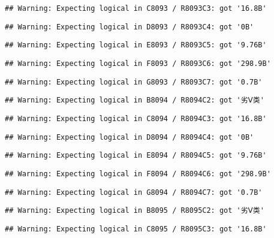 \documentclass[
]{article}
\begin{document}
\begin{verbatim}
## Warning: Expecting logical in C8093 / R8093C3: got '16.8B'
\end{verbatim}

\begin{verbatim}
## Warning: Expecting logical in D8093 / R8093C4: got '0B'
\end{verbatim}

\begin{verbatim}
## Warning: Expecting logical in E8093 / R8093C5: got '9.76B'
\end{verbatim}

\begin{verbatim}
## Warning: Expecting logical in F8093 / R8093C6: got '298.9B'
\end{verbatim}

\begin{verbatim}
## Warning: Expecting logical in G8093 / R8093C7: got '0.7B'
\end{verbatim}

\begin{verbatim}
## Warning: Expecting logical in B8094 / R8094C2: got '劣Ⅴ类'
\end{verbatim}

\begin{verbatim}
## Warning: Expecting logical in C8094 / R8094C3: got '16.8B'
\end{verbatim}

\begin{verbatim}
## Warning: Expecting logical in D8094 / R8094C4: got '0B'
\end{verbatim}

\begin{verbatim}
## Warning: Expecting logical in E8094 / R8094C5: got '9.76B'
\end{verbatim}

\begin{verbatim}
## Warning: Expecting logical in F8094 / R8094C6: got '298.9B'
\end{verbatim}

\begin{verbatim}
## Warning: Expecting logical in G8094 / R8094C7: got '0.7B'
\end{verbatim}

\begin{verbatim}
## Warning: Expecting logical in B8095 / R8095C2: got '劣Ⅴ类'
\end{verbatim}

\begin{verbatim}
## Warning: Expecting logical in C8095 / R8095C3: got '16.8B'
\end{verbatim}
\end{document}
